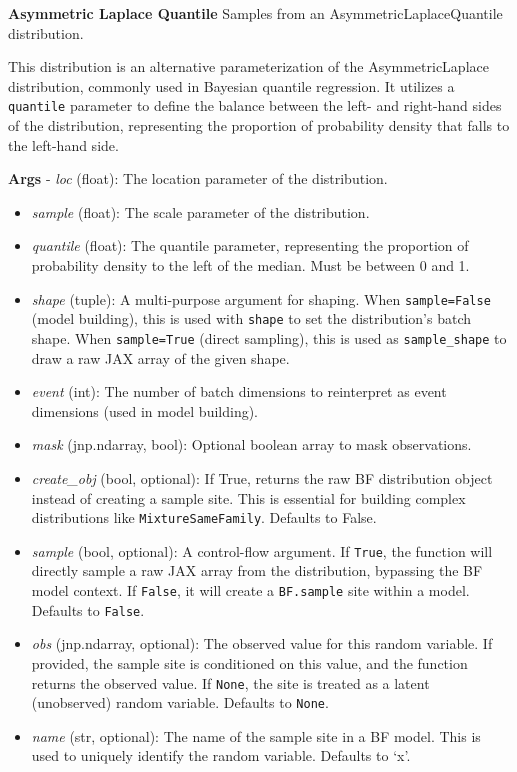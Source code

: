 \documentclass[
  letterpaper,
  DIV=11,
  numbers=noendperiod]{scrartcl}
\begin{document}
\textbf{Asymmetric Laplace Quantile} Samples from an
AsymmetricLaplaceQuantile distribution.

This distribution is an alternative parameterization of the
AsymmetricLaplace distribution, commonly used in Bayesian quantile
regression. It utilizes a \texttt{quantile} parameter to define the
balance between the left- and right-hand sides of the distribution,
representing the proportion of probability density that falls to the
left-hand side.

\textbf{Args} - \emph{loc} (float): The location parameter of the
distribution.

\begin{itemize}
\item
  \emph{sample} (float): The scale parameter of the distribution.
\item
  \emph{quantile} (float): The quantile parameter, representing the
  proportion of probability density to the left of the median. Must be
  between 0 and 1.
\item
  \emph{shape} (tuple): A multi-purpose argument for shaping. When
  \texttt{sample=False} (model building), this is used with
  \texttt{shape} to set the distribution's batch shape. When
  \texttt{sample=True} (direct sampling), this is used as
  \texttt{sample\_shape} to draw a raw JAX array of the given shape.
\item
  \emph{event} (int): The number of batch dimensions to reinterpret as
  event dimensions (used in model building).
\item
  \emph{mask} (jnp.ndarray, bool): Optional boolean array to mask
  observations.
\item
  \emph{create\_obj} (bool, optional): If True, returns the raw BF
  distribution object instead of creating a sample site. This is
  essential for building complex distributions like
  \texttt{MixtureSameFamily}. Defaults to False.
\item
  \emph{sample} (bool, optional): A control-flow argument. If
  \texttt{True}, the function will directly sample a raw JAX array from
  the distribution, bypassing the BF model context. If \texttt{False},
  it will create a \texttt{BF.sample} site within a model. Defaults to
  \texttt{False}.
\item
  \emph{obs} (jnp.ndarray, optional): The observed value for this random
  variable. If provided, the sample site is conditioned on this value,
  and the function returns the observed value. If \texttt{None}, the
  site is treated as a latent (unobserved) random variable. Defaults to
  \texttt{None}.
\item
  \emph{name} (str, optional): The name of the sample site in a BF
  model. This is used to uniquely identify the random variable. Defaults
  to `x'.
\end{itemize}
\end{document}

